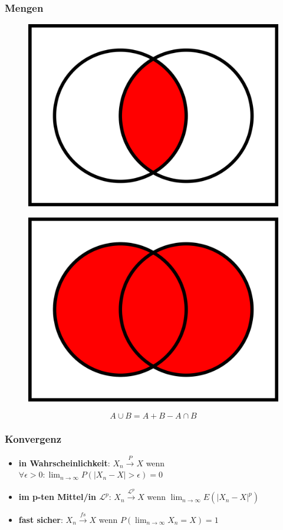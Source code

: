 \subsubsection{Mengen}

\begin{figure}[ht]
    \centering
    \begin{minipage}{.5\textwidth}
      \centering
      \includegraphics[width=.4\linewidth]{mehrdimWktrechnung/Venn0001.svg.png}
      \label{fig:schnittmenge}
    \end{minipage}%
    \begin{minipage}{.5\textwidth}
      \centering
      \includegraphics[width=.4\linewidth]{mehrdimWktrechnung/Venn0111.svg.png}
      \label{fig:vereinigungsmenge}
    \end{minipage}
\end{figure}

\begin{equation*}
    A\cup B = A+B-A\cap B
\end{equation*}

\subsubsection{Konvergenz}

\begin{itemize}
    \item \textbf{in Wahrscheinlichkeit}: \(X_n \xrightarrow{P} X\) wenn \(\forall \epsilon > 0: \lim_{n\rightarrow\infty}P(|X_n-X|>\epsilon)=0\)
    \item \textbf{im p-ten Mittel/in \(\mathcal{L}^p\)}: \(X_n \xrightarrow{\mathcal{L}^p} X\) wenn \(\lim_{n\rightarrow\infty}E(|X_n-X|^p)\)
    \item \textbf{fast sicher}: \(X_n \xrightarrow{fs} X\) wenn \(P(\lim_{n\rightarrow\infty}X_n=X)=1\)
\end{itemize}


